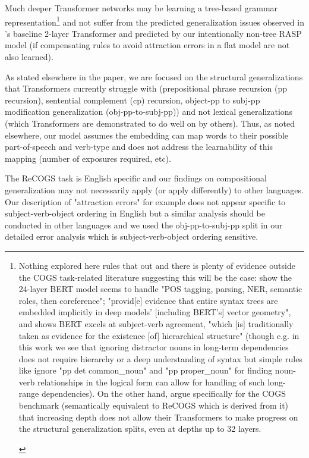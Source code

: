 \documentclass[11pt]{article}
\begin{document}
Much deeper Transformer networks may be learning a tree-based grammar representation\footnote{\begin{footnotesize}Nothing explored here rules that out and there is plenty of evidence outside the COGS task-related literature suggesting this will be the case: \citep{tenney2019bertrediscoversclassicalnlp} show the 24-layer BERT model seems to handle "POS tagging, parsing, NER, semantic roles, then coreference"; \citep{hewitt-manning-2019-structural} "provid[e] evidence that entire syntax trees are embedded implicitly in deep models’ [including BERT's] vector geometry", and \citep{goldberg2019assessingbertssyntacticabilities} shows BERT excels at subject-verb agreement, "which [is] traditionally taken as evidence for
the existence [of] hierarchical structure" (though e.g. in this work we see that ignoring distractor nouns in long-term dependencies does not require hierarchy or a deep understanding of syntax but simple rules like ignore "pp det common\_noun" and "pp proper\_noun" for finding noun-verb relationships in the logical form can allow for handling of such long-range dependencies). On the other hand, \citep{petty2024impactdepthcompositionalgeneralization} argue specifically for the COGS benchmark (semantically equivalent to ReCOGS which is derived from it) that increasing depth does not allow their Transformers to make progress on the structural generalization splits, even at depths up to 32 layers.
\end{footnotesize}
} and not suffer from the predicted generalization issues observed in \citep{Wu2023}'s baseline 2-layer Transformer and predicted by our intentionally non-tree RASP model (if compensating rules to avoid attraction errors in a flat model are not also learned).

As stated elsewhere in the paper, we are focused on the structural generalizations that Transformers currently struggle with (prepositional phrase recursion (pp recursion), sentential complement (cp) recursion, object-pp to subj-pp modification generalization (obj-pp-to-subj-pp)) and not lexical generalizations (which Transformers are demonstrated to do well on by others). Thus, as noted elsewhere, our model assumes the embedding can map words to their possible part-of-speech and verb-type and does not address the learnability of this mapping (number of exposures required, etc).

The ReCOGS task is English specific and our findings on compositional generalization may not necessarily apply (or apply differently) to other languages. Our description of "attraction errors" for example does not appear specific to subject-verb-object ordering in English but a similar analysis should be conducted in other languages and we used the obj-pp-to-subj-pp split in our detailed error analysis which is subject-verb-object ordering sensitive.
\end{document}
